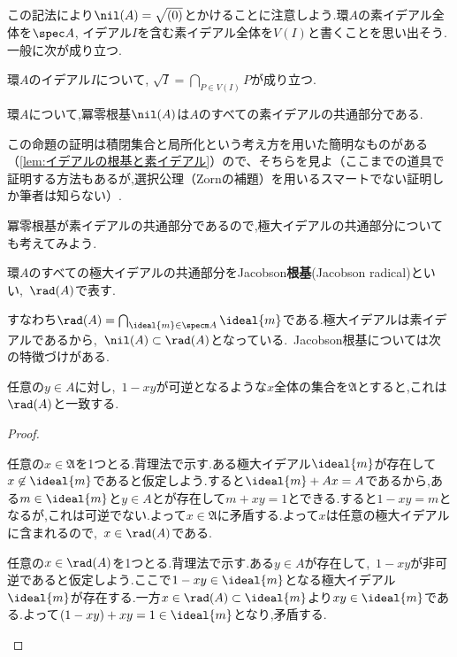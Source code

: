 この記法により$\nil (A)=\sqrt{(0)}$とかけることに注意しよう.環$A$の素イデアル全体を$\spec A$, イデアル$I$を含む素イデアル全体を$V(I)$と書くことを思い出そう.一般に次が成り立つ.

\begin{prop}
	環$A$のイデアル$I$について, $\sqrt{I}=\bigcap_{P\in V(I)}P$が成り立つ.
\end{prop}

\begin{cor}
	環$A$について,冪零根基$\nil (A)$は$A$のすべての素イデアルの共通部分である.
\end{cor}

この命題の証明は積閉集合と局所化という考え方を用いた簡明なものがある（\ref{lem:イデアルの根基と素イデアル}）ので、そちらを見よ（ここまでの道具で証明する方法もあるが,選択公理（Zornの補題）を用いるスマートでない証明しか筆者は知らない）.

冪零根基が素イデアルの共通部分であるので,極大イデアルの共通部分についても考えてみよう.
\begin{defi}[Jacobson根基]
	環$A$のすべての極大イデアルの共通部分をJacobson\textbf{根基}(Jacobson radical)といい,~$\rad(A)$で表す.
\end{defi}

すなわち$\rad(A)=\bigcap_{\ideal{m}\in\specm A}\ideal{m}$である.極大イデアルは素イデアルであるから,~$\nil(A)\subset\rad(A)$となっている.~Jacobson根基については次の特徴づけがある.
\begin{prop}
	任意の$y\in A$に対し,~$1-xy$が可逆となるような$x$全体の集合を$\mathfrak{A}$とすると,これは$\rad(A)$と一致する.
\end{prop}
\begin{proof}
	\begin{mrkw}
		\item 
		任意の$x\in\mathfrak{A}$を1つとる.背理法で示す.ある極大イデアル$\ideal{m}$が存在して$x\not\in\ideal{m}$であると仮定しよう.すると$\ideal{m}+Ax=A$であるから,ある$m\in\ideal{m}$と$y\in A$とが存在して$m+xy=1$とできる.すると$1-xy=m$となるが,これは可逆でない.よって$x\in\mathfrak{A}$に矛盾する.よって$x$は任意の極大イデアルに含まれるので,~$x\in\rad(A)$である.
		\item 
		任意の$x\in\rad(A)$を1つとる.背理法で示す.ある$y\in A$が存在して,~$1-xy$が非可逆であると仮定しよう.ここで$1-xy\in\ideal{m}$となる極大イデアル$\ideal{m}$が存在する.一方$x\in\rad(A)\subset\ideal{m}$より$xy\in\ideal{m}$である.よって$(1-xy)+xy=1\in\ideal{m}$となり,矛盾する.
	\end{mrkw}
\end{proof}

